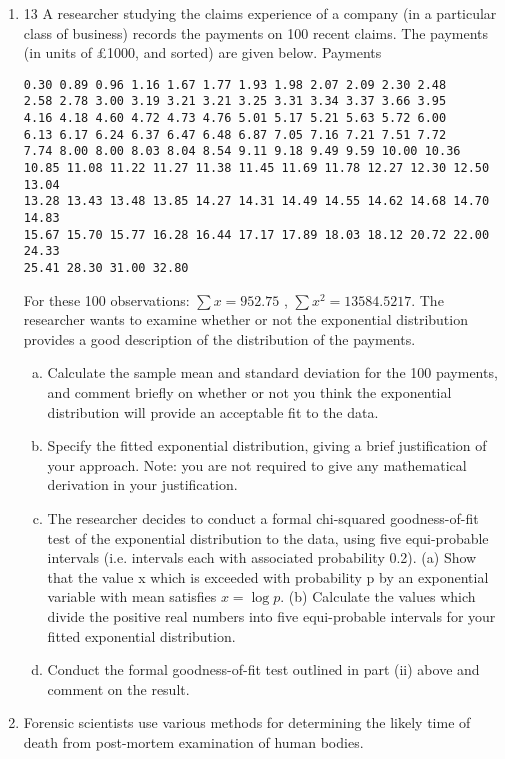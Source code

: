\documentclass[a4paper,12pt]{article}
\begin{document}
\begin{enumerate}
\item
13 A researcher studying the claims experience of a company (in a particular class of business) records the payments on 100 recent claims. The payments (in units of £1000, and sorted) are given below.
Payments
\begin{verbatim}
0.30 0.89 0.96 1.16 1.67 1.77 1.93 1.98 2.07 2.09 2.30 2.48
2.58 2.78 3.00 3.19 3.21 3.21 3.25 3.31 3.34 3.37 3.66 3.95
4.16 4.18 4.60 4.72 4.73 4.76 5.01 5.17 5.21 5.63 5.72 6.00
6.13 6.17 6.24 6.37 6.47 6.48 6.87 7.05 7.16 7.21 7.51 7.72
7.74 8.00 8.00 8.03 8.04 8.54 9.11 9.18 9.49 9.59 10.00 10.36
10.85 11.08 11.22 11.27 11.38 11.45 11.69 11.78 12.27 12.30 12.50 13.04
13.28 13.43 13.48 13.85 14.27 14.31 14.49 14.55 14.62 14.68 14.70 14.83
15.67 15.70 15.77 16.28 16.44 17.17 17.89 18.03 18.12 20.72 22.00 24.33
25.41 28.30 31.00 32.80
\end{verbatim}

For these 100 observations: $\sum x = 952.75$ , $\sum x^2 = 13584.5217$.
The researcher wants to examine whether or not the exponential distribution provides
a good description of the distribution of the payments.
\begin{enumerate}[(a)]
\item Calculate the sample mean and standard deviation for the 100 payments, and comment briefly on whether or not you think the exponential distribution will provide an acceptable fit to the data.
\item Specify the fitted exponential distribution, giving a brief justification of your approach.
Note: you are not required to give any mathematical derivation in your justification.
\item The researcher decides to conduct a formal chi-squared goodness-of-fit test of the exponential distribution to the data, using five equi-probable intervals (i.e. intervals each with associated probability 0.2).
(a) Show that the value x which is exceeded with probability p by an exponential variable with mean satisfies $x = \log p$.
(b) Calculate the values which divide the positive real numbers into five equi-probable intervals for your fitted exponential distribution.
\item  Conduct the formal goodness-of-fit test outlined in part (ii) above and
comment on the result. 
\end{enumerate}
\item Forensic scientists use various methods for determining the likely time of death from
post-mortem examination of human bodies.


\end{enumerate}
\end{document}
